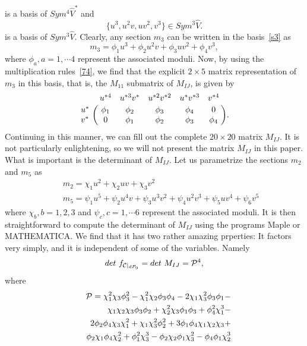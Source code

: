 \documentclass[a4paper,12pt]{article}
\numberwithin{equation}{section}
\theoremstyle{plain}
\begin{document}
%
is a basis of $Sym^{4}\hat{V}^{*}$ and
%
\begin{equation}
\{u^{3}, u^{2}v, uv^{2}, v^{3} \}\in Sym^{3}\hat{V}.
\label{s3}
\end{equation}
%
is a basis of $Sym^{3}\hat{V}$.
Clearly, any section $m_3$ can be written in the basis~\eqref{s3} as
%
\begin{equation}
m_3 = \phi_1 u^3 +\phi_2 u^2v + \phi_3 uv^2 + \phi_4 v^3,
\label{76}
\end{equation}
%
where $\phi_{a}, a=1, \cdots 4$ represent the associated moduli. Now, by
using
the multiplication rules~\eqref{74}, we find that the explicit $2 \times
5$
matrix representation of $m_3$ in this basis, that is, the
$M_{11}$ submatrix of $M_{IJ}$, is given by
%
\begin{equation}
\bordermatrix{    & u^{*4}  & u^{*3}v^{*} & u^{*2}v^{*2}  & u^{*}v^{*3} &
v^{*4} \cr
              u^* & \phi_1  & \phi_2      & \phi_3        & \phi_4      &
0      \cr
              v^* & 0       & \phi_1      & \phi_2        & \phi_3      &
\phi_4  \cr}.
\label{77}
\end{equation}
%
Continuing in this manner, we can fill out the complete $20 \times 20$
matrix $M_{IJ}$.
It is not particularly enlightening, so we will not present the matrix
$M_{IJ}$
in this paper. What is important is the determinant of $M_{IJ}$. Let us
parametrize the
sections $m_2$ and $m_5$ as
%
\begin{eqnarray}
&&m_2 = \chi_1 u^2 + \chi_2 uv + \chi_3 v^2 \nonumber \\
&&m_5 = \psi_1 u^5 + \psi_2 u^4v + \psi_3 u^3v^2 + \psi_4 u^2v^3
+ \psi_5 uv^4 + \psi_6 v^5
\label{78}
\end{eqnarray}
%
where $\chi_b, b=1, 2, 3$ and $\psi_c, c=1, \cdots 6$ represent the
associated
moduli. It is then straightforward to compute the determinant of
$M_{IJ}$ using the programs Maple or MATHEMATICA. We find that
it has two rather amazing prperties: It factors very simply,
and it is independent of some of the variables. Namely
\begin{equation}
det{\ }f_{{\cal{C}}|_{dP_{9}}} = det{\ }M_{IJ} = {\cal{P}}^{4},
\label{79}
\end{equation}
%
where
%
\begin{eqnarray}
&&{\cal{P}} =
\chi_1^2 \chi_3 \phi_3^2 -
\chi_1^2 \chi_2 \phi_3 \phi_4 -
2\chi_1 \chi_3^2  \phi_3 \phi_1 - \nonumber \\
&&\chi_1 \chi_2 \chi_3  \phi_3 \phi_2 +
\chi_2^2 \chi_3  \phi_1 \phi_3 +
\phi_4^2 \chi_1^3 -              \nonumber \\
&&2 \phi_2 \phi_4 \chi_3 \chi_1^2  +
\chi_1 \chi_3^2 \phi_2^2 +
3 \phi_1 \phi_4 \chi_1 \chi_2 \chi_3 + \nonumber \\
&&\phi_2 \chi_1 \phi_4 \chi_2^2 +
\phi_1^2 \chi_3^3 -
\phi_2 \chi_2 \phi_1 \chi_3^2-
\phi_4 \phi_1 \chi_2^3
\label{80}
\end{eqnarray}
\end{document}
